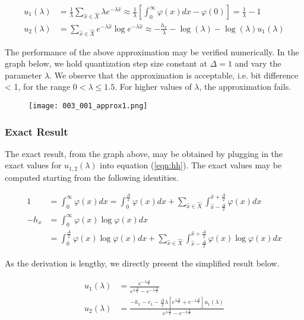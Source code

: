 \begin{align} u_1(\lambda) &= \frac{1}{\lambda} \sum_{\hat{x} \in \hat{X}} \lambda e^{-\lambda\hat{x}} \approx   \frac{1}{\lambda} \left[ \int_{0}^{\infty} \varphi(x) dx - \varphi(0) \right] = \frac{1}{\lambda} - 1\\ u_2(\lambda) &= \sum_{\hat{x} \in \hat{X}} e^{-\lambda\hat{x}} \log e^{-\lambda\hat{x}} \approx -\frac{h_x}{\lambda} - \log(\lambda)  - \log(\lambda) u_1(\lambda)\end{align}

The performance of the above approximation may be verified numerically. In the graph below, we hold quantization step size constant at $\Delta = 1$ and vary the parameter $\lambda$. We observe that the approximation is acceptable, i.e. bit difference < 1, for the range $0 < \lambda \leq 1.5$. For higher values of $\lambda$, the approximation fails.

\begin{figure}[H]
	\centering
	\texttt{[image: 003\_001\_approx1.png]}
\end{figure}

\subsubsection{Exact Result}

The exact result, from the graph above, may be obtained by plugging in the exact values for $u_{1,2}(\lambda)$ into equation (\ref{eqn:hh}). The exact values may be computed starting from the following identities.

\begin{align} 1 &= \int_{0}^{\infty} \varphi(x) dx = \int_{0}^{\frac{\Delta}{2}} \varphi(x) dx + \sum_{\hat{x} \in \hat{X}} \int_{\hat{x} - \frac{\Delta}{2}}^{\hat{x} + \frac{\Delta}{2}} \varphi(x) dx \\ -h_x &= \int_{0}^{\infty} \varphi(x) \log \varphi(x) dx \nonumber \\ &= \int_{0}^{\frac{\Delta}{2}} \varphi(x) \log \varphi(x) dx + \sum_{\hat{x} \in \hat{X}} \int_{\hat{x} - \frac{\Delta}{2}}^{\hat{x} + \frac{\Delta}{2}} \varphi(x) \log \varphi(x) dx\end{align}

As the derivation is lengthy, we directly present the simplified result below.

\begin{align} u_1(\lambda) &= \frac{e^{-\lambda\frac{\Delta}{2}}}{e^{\lambda\frac{\Delta}{2}} - e^{-\lambda\frac{\Delta}{2}}} \\ u_2(\lambda) &= \frac{-h_x - c_1  - \frac{\Delta}{2}\lambda  \left[e^{\lambda\frac{\Delta}{2}} + e^{-\lambda\frac{\Delta}{2}}\right] u_1(\lambda)}{e^{\lambda\frac{\Delta}{2}} - e^{-\lambda\frac{\Delta}{2}}}\end{align}

